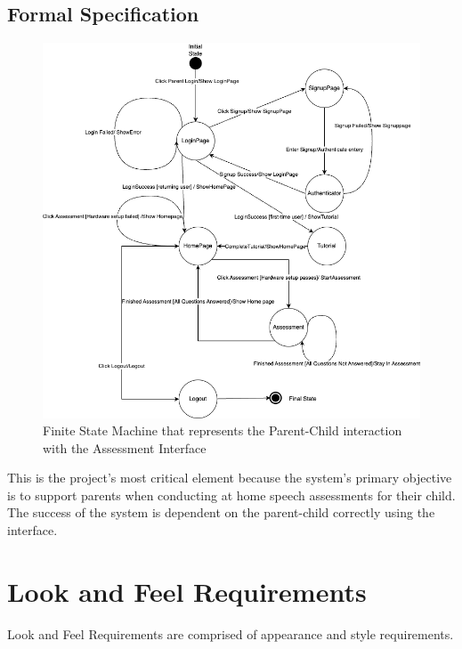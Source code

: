 \documentclass[12pt]{article}
\begin{document}
\newpage

\subsection*{Formal Specification}
\begin{figure}[H]
  \centering
  \includegraphics[scale=0.5]{images/TeleHealth_StateMachine.png}
  \caption{Finite State Machine that represents the Parent-Child interaction with the Assessment Interface}
\end{figure}

\hspace{2em}This is the project's most critical element because the system's primary objective is to support parents when conducting at home speech assessments for their child. 
The success of the system is dependent on the parent-child correctly using the interface.

\newpage

\section{Look and Feel Requirements}
\hspace{2em}Look and Feel Requirements are comprised of appearance and style requirements.
\end{document}

